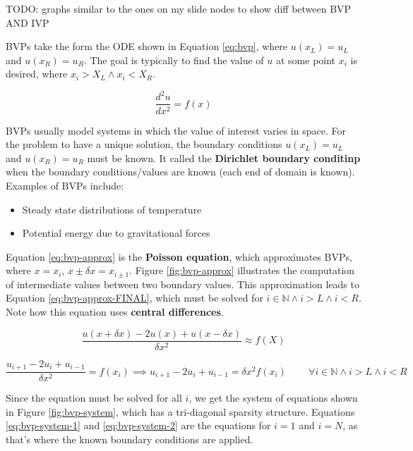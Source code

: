 \documentclass{article}
\begin{document}
TODO: graphs similar to the ones on my slide nodes to show diff between BVP AND IVP

BVPs take the form the ODE shown in Equation \ref{eq:bvp}, where $u(x_L) = u_L$ and $u(x_R) = u_R$. The goal is typically to find the value of $u$ at some point $x_i$ is desired, where $x_i > X_L \land x_i < X_R$.

\begin{equation}
	\frac{d^2 u}{dx^2} = f(x)
	\label{eq:bvp}
\end{equation}

BVPs usually model systems in which the value of interest varies in space. For the problem to have a unique solution, the boundary conditions $u(x_L) = u_L$ and $u(x_R) = u_R$ must be known. It called the \textbf{Dirichlet boundary conditinp} when the boundary conditions/values are known (each end of domain is known). Examples of BVPs include:
\begin{itemize}
	\item Steady state distributions of temperature
	\item Potential energy due to gravitational forces
\end{itemize}

Equation \ref{eq:bvp-approx} is the \textbf{Poisson equation}, which approximates BVPs, where $x = x_i$, $x \pm \delta x = x_{i \pm 1}$. Figure \ref{fig:bvp-approx} illustrates the computation of intermediate values between two boundary values. This approximation leads to Equation \ref{eq:bvp-approx-FINAL}, which must be solved for $i \in \mathbb{N} \land i > L \land i < R$. Note how this equation uses \textbf{central differences}.

\begin{equation}
	\frac{u(x + \delta x) - 2u(x) + u(x - \delta x)}{\delta x^2} \approx f(X)
	\label{eq:bvp-approx}
\end{equation}

\begin{equation}
	\frac{u_{i+1} - 2u_i + u_{i - 1}}{\delta x^2} = f(x_i)
	\implies
	u_{i+1} - 2u_i + u_{i - 1} = \delta x^2 f(x_i) 
	\;\;\;\;\;\;\;\; \forall 
	i \in \mathbb{N} \land i > L \land i < R
	\label{eq:bvp-approx-final}
\end{equation}

Since the equation must be solved for all $i$, we get the system of equations shown in Figure \ref{fig:bvp-system}, which has a tri-diagonal sparsity structure. Equations \ref{eq:bvp-system-1} and \ref{eq:bvp-system-2} are the equations for $i = 1$ and $i = N$, as that's where the known boundary conditions are applied.
\end{document}
